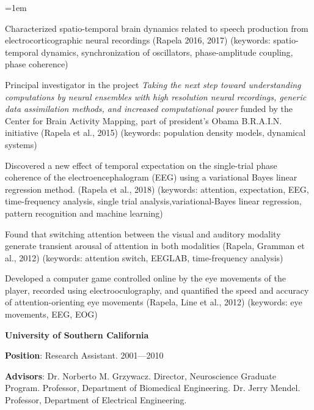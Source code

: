 \documentclass{article}
\begin{document}
\begin{list}{}{\leftmargin=1em}

\item Characterized spatio-temporal brain dynamics related to speech
production from electrocorticographic neural recordings (Rapela 2016, 2017)
(keywords: spatio-temporal dynamics, synchronization of oscillators, phase-amplitude coupling, phase coherence)

\item Principal investigator in the project \emph{Taking the next step toward
understanding computations by neural ensembles with high resolution
neural recordings, generic data assimilation methods, and increased
computational power} funded by the Center for Brain Activity Mapping, part of
president's Obama B.R.A.I.N. initiative (Rapela et al., 2015) (keywords: population density models, dynamical systems)

\item Discovered a new effect of temporal expectation on the single-trial
phase coherence of the electroencephalogram (EEG) using a variational Bayes
linear regression method. (Rapela et al., 2018) (keywords: attention,
expectation, EEG, time-frequency analysis, single trial
analysis,variational-Bayes linear regression, pattern recognition and machine
learning)

\item Found that switching attention between the visual and auditory modality
generate transient arousal of attention in both modalities (Rapela, Gramman et
al., 2012) (keywords: attention switch, EEGLAB, time-frequency analysis)

\item Developed a computer game controlled online by the eye movements of the
player, recorded using electrooculography, and quantified the speed and
accuracy of attention-orienting eye movements (Rapela, Line et al., 2012)
(keywords: eye movements, EEG, EOG)

\end{list}

\par
\vspace{2\baselineskip}
{\bf University of Southern California}
\par
{\bf Position}: Research Assistant. \hspace*{\fill} 2001---2010
\par
{\bf Advisors}: Dr. Norberto M. Grzywacz. Director, Neuroscience Graduate
Program. Professor, Department of Biomedical Engineering. Dr. Jerry Mendel.
Professor, Department of Electrical Engineering.
\end{document}
